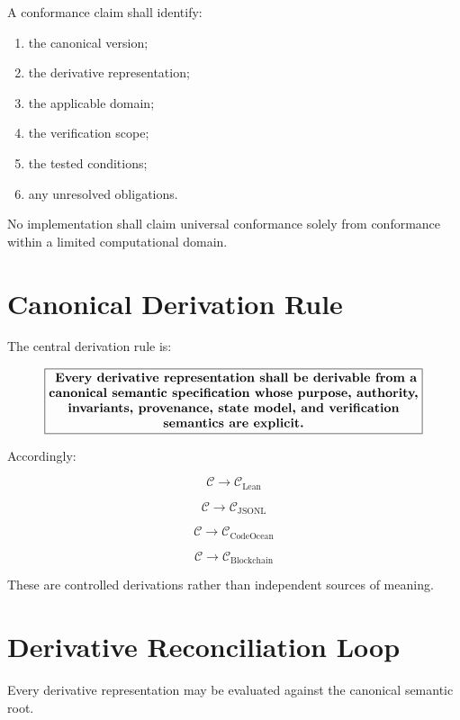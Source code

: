 \documentclass[11pt]{article}
\newcommand{\Spec}{\mathcal{C}}
\begin{document}
A conformance claim shall identify:

\begin{enumerate}
    \item the canonical version;
    \item the derivative representation;
    \item the applicable domain;
    \item the verification scope;
    \item the tested conditions;
    \item any unresolved obligations.
\end{enumerate}

No implementation shall claim universal conformance solely from
conformance within a limited computational domain.

\section{Canonical Derivation Rule}

The central derivation rule is:

\[
\boxed{
\parbox{0.85\textwidth}{\centering\textbf{
Every derivative representation shall be derivable from a
canonical semantic specification whose purpose, authority,
invariants, provenance, state model, and verification semantics
are explicit.
}}
}
\]

Accordingly:

\[
\boxed{
\Spec
\rightarrow
\Spec_{\mathrm{Lean}}
}
\]

\[
\boxed{
\Spec
\rightarrow
\Spec_{\mathrm{JSONL}}
}
\]

\[
\boxed{
\Spec
\rightarrow
\Spec_{\mathrm{CodeOcean}}
}
\]

\[
\boxed{
\Spec
\rightarrow
\Spec_{\mathrm{Blockchain}}
}
\]

These are controlled derivations rather than independent sources
of meaning.

\section{Derivative Reconciliation Loop}

Every derivative representation may be evaluated against the
canonical semantic root.
\end{document}
